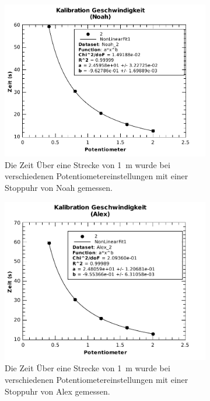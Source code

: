 \begin{figure}[H]
    \centering
    \begin{subfigure}{.7\textwidth}
        \includegraphics[width=\linewidth]{images/kalibration_geschwindigkeit_noah}
        \caption{Die Zeit \"Uber eine Strecke von \SI{1}{\meter} wurde bei verschiedenen Potentiometereinstellungen mit einer Stoppuhr von Noah gemessen.}
    \end{subfigure}
    \begin{subfigure}{.7\textwidth}
        \includegraphics[width=\linewidth]{images/kalibration_geschwindigkeit_alex}
        \caption{Die Zeit \"Uber eine Strecke von \SI{1}{\meter} wurde bei verschiedenen Potentiometereinstellungen mit einer Stoppuhr von Alex gemessen.}
    \end{subfigure}
    \caption{}\label{fig:kalibration_geschwindigkeit}
\end{figure}

